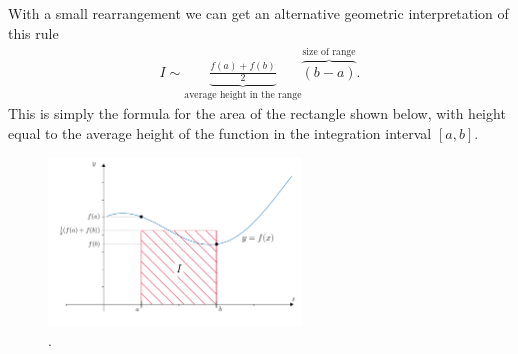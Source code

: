 \noindent {}

With a small rearrangement we can get an alternative geometric interpretation of this rule
\begin{align*}
I \sim \underbrace{\frac{f(a) + f(b)}{2}}_\text{average height in the range} \overbrace{\left(b-a \right)}^\text{size of range}.
\end{align*}
This is simply the formula for the area of the rectangle shown below, with height equal to the average height of the function in the integration interval $[a,b]$.

\begin{figure}[H]
	\begin{center}
	\includegraphics[width=0.6\textwidth]{figures/ch5_trapezium_alternative.pdf} 
	  \caption{.} \label{fig:ch5_trapezium_alternative}
	\end{center}
\end{figure}


